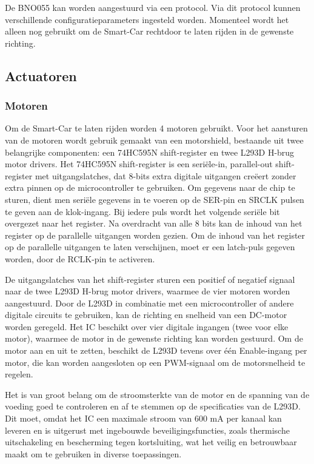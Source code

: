 De BNO055\cite{AXIS} kan worden aangestuurd via een protocol. Via dit protocol kunnen verschillende configuratieparameters ingesteld worden. Momenteel wordt het alleen nog gebruikt om de \gls{Smart-Car} rechtdoor te laten rijden in de gewenste richting. 
\subsection{Actuatoren}
\subsubsection{Motoren}
Om de \gls{Smart-Car} te laten rijden worden 4 motoren gebruikt. Voor het aansturen van de motoren wordt gebruik gemaakt van een \gls{motorshield}, bestaande uit twee belangrijke componenten: een 74HC595N\cite{shiftregister} \gls{shift-register} en twee L293D\cite{h-brug} \gls{H-brug} motor drivers. Het 74HC595N\cite{shiftregister} \gls{shift-register} is een seriële-in, parallel-out \gls{shift-register} met uitgangslatches, dat 8-bits extra digitale uitgangen creëert zonder extra pinnen op de \gls{microcontroller} te gebruiken. Om gegevens naar de chip te sturen, dient men seriële gegevens in te voeren op de SER-pin en SRCLK pulsen te geven aan de klok-ingang. Bij iedere puls wordt het volgende seriële bit overgezet naar het \gls{register}. Na overdracht van alle 8 bits kan de inhoud van het \gls{register} op de parallelle uitgangen worden gezien. Om de inhoud van het \gls{register} op de parallelle uitgangen te laten verschijnen, moet er een latch-puls gegeven worden, door de RCLK-pin te activeren.

De uitgangslatches van het \gls{shift-register} sturen een positief of negatief signaal naar de twee L293D\cite{h-brug} \gls{H-brug} motor drivers, waarmee de vier motoren worden aangestuurd. Door de L293D\cite{h-brug} in combinatie met een \gls{microcontroller} of andere digitale circuits te gebruiken, kan de richting en snelheid van een DC-motor worden geregeld. Het IC beschikt over vier digitale ingangen (twee voor elke motor), waarmee de motor in de gewenste richting kan worden gestuurd. Om de motor aan en uit te zetten, beschikt de L293D\cite{h-brug} tevens over één Enable-ingang per motor, die kan worden aangesloten op een \gls{PWM}-signaal om de motorsnelheid te regelen.

Het is van groot belang om de stroomsterkte van de motor en de spanning van de voeding goed te controleren en af te stemmen op de specificaties van de L293D\cite{h-brug}. Dit moet, omdat het IC een maximale stroom van 600 mA per kanaal kan leveren en is uitgerust met ingebouwde beveiligingsfuncties, zoals \gls{thermische} uitschakeling en bescherming tegen kortsluiting, wat het veilig en betrouwbaar maakt om te gebruiken in diverse toepassingen.

